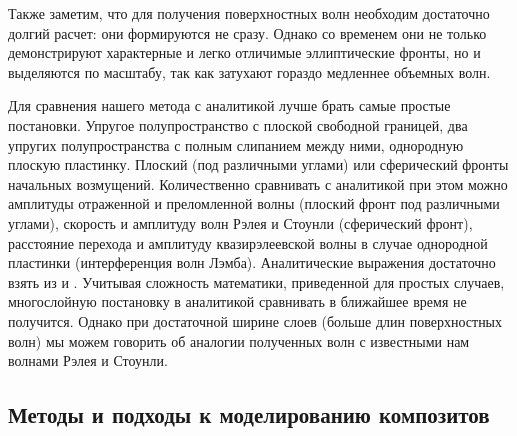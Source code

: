 Также заметим, что для получения поверхностных волн необходим достаточно долгий расчет: они формируются не сразу. Однако со временем они не только демонстрируют характерные и легко отличимые эллиптические фронты, но и выделяются по масштабу, так как затухают гораздо медленнее объемных волн. 

Для сравнения нашего метода с аналитикой лучше брать самые простые постановки. Упругое полупространство с плоской свободной границей, два упругих полупространства с полным слипанием между ними, однородную плоскую пластинку. Плоский (под различными углами) или сферический фронты начальных возмущений. Количественно сравнивать с аналитикой при этом можно амплитуды отраженной и преломленной волны (плоский фронт под различными углами), скорость и амплитуду волн Рэлея и Стоунли (сферический фронт), расстояние перехода и амплитуду квазирэлеевской волны в случае однородной пластинки (интерференция волн Лэмба). Аналитические выражения достаточно взять из \cite{aki_richards} и \cite{viktorov}. Учитывая сложность математики, приведенной для простых случаев, многослойную постановку в аналитикой сравнивать в ближайшее время не получится. Однако при достаточной ширине слоев (больше длин поверхностных волн) мы можем говорить об аналогии полученных волн с известными нам волнами Рэлея и Стоунли.


\subsection{Методы и подходы к моделированию композитов}

